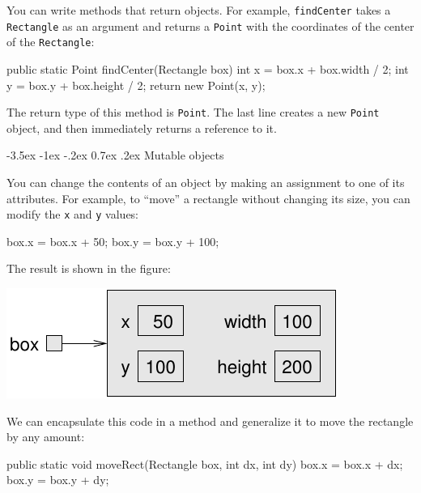 \documentclass[12pt]{book}
\makeatletter
\theoremstyle{exercise}
\newcommand{\java}[1]{\verb"#1"}
\renewcommand{\section}{\@startsection{section}{1}{\z@}%
    {-3.5ex \@plus -1ex \@minus -.2ex}%
    {0.7ex \@plus.2ex}%
    {\normalfont\Large\bfseries}}
\newcommand{\java}[1]{\lstinline{#1}} %
\makeatother
\begin{document}

You can write methods that return objects.
For example, \java{findCenter} takes a \java{Rectangle} as an argument and returns a \java{Point} with the coordinates of the center of the \java{Rectangle}:

\begin{code}
    public static Point findCenter(Rectangle box) {
        int x = box.x + box.width / 2;
        int y = box.y + box.height / 2;
        return new Point(x, y);
    }
\end{code}

The return type of this method is \java{Point}.
The last line creates a new \java{Point} object, and then immediately returns a reference to it.


\section{Mutable objects}


You can change the contents of an object by making an assignment to one of its attributes.
For example, to ``move'' a rectangle without changing its size, you can modify the \java{x} and \java{y} values:

\begin{code}
    box.x = box.x + 50;
    box.y = box.y + 100;
\end{code}

The result is shown in the figure:

\begin{center}
\includegraphics{figs/rectangle2.pdf}
\end{center}


We can encapsulate this code in a method and generalize it to move the rectangle by any amount:

\begin{code}
    public static void moveRect(Rectangle box, int dx, int dy) {
        box.x = box.x + dx;
        box.y = box.y + dy;
    }
\end{code}
\end{document}
